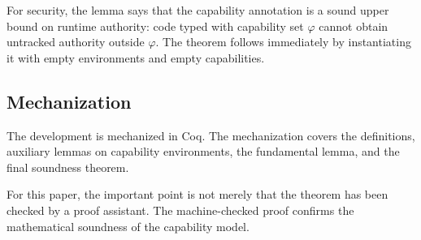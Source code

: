 For security, the lemma says that the capability annotation is a sound upper
bound on runtime authority: code typed with capability set $\varphi$ cannot
obtain untracked authority outside $\varphi$. %
The theorem follows
immediately by instantiating it with empty environments and empty
capabilities. %

\subsection{Mechanization}

The development is mechanized in Coq. %
The mechanization covers the definitions, auxiliary lemmas on capability
environments, the fundamental lemma, and the final soundness theorem. %

For this paper, the important point is not merely that the theorem has been
checked by a proof assistant. %
The machine-checked proof confirms the mathematical soundness of the capability
model. %
